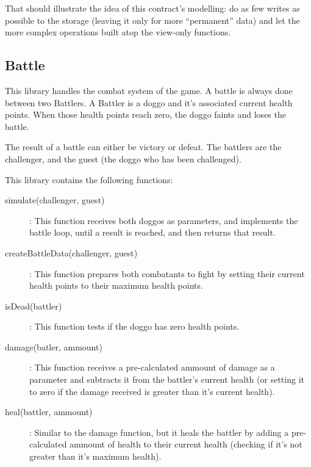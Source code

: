 \documentclass{article}
\begin{document}
    That should illustrate the idea of this contract's modelling: do as few
    writes as possible to the storage (leaving it only for more ``permanent''
    data) and let the more complex operations built atop the view-only
    functions.

    \subsection{Battle}
    This library handles the combat system of the game. A battle is always
    done between two Battlers. A Battler is a doggo and it's associated
    current health points. When those health points reach zero, the doggo 
    faints and loses the battle. 

    The result of a battle can either be victory or defeat. The battlers are
    the challenger, and the guest (the doggo who has been challenged).

    This library contains the following functions: 
    \begin{description}
        \item[simulate(challenger, guest)]: This function receives both doggos as parameters,
        and implements the battle loop, until a result is reached, and then 
        returns that result.
        \item[createBattleData(challenger, guest)]: This function prepares both combatants to 
        fight by setting their current health points to their maximum health
        points.
        \item[isDead(battler)]: This function tests if the doggo has zero health 
        points. 
        \item[damage(batler, ammount)]: This function receives a pre-calculated ammount of damage 
        as a parameter and subtracts it from the battler's current health (or setting 
        it to zero if the damage received is greater than it's current health).
        \item[heal(battler, ammount)]: Similar to the damage function, but it 
        heals the battler by adding a pre-calculated ammount of health to their 
        current health (checking if it's not greater than it's maximum health). 
    \end{description}
\end{document}
